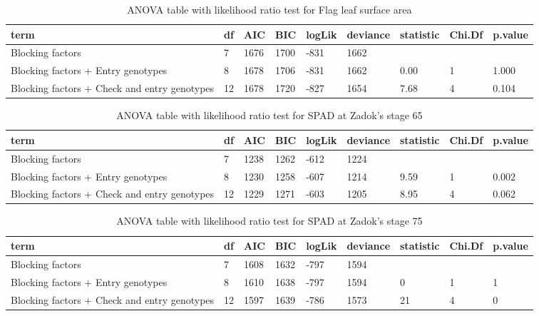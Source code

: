 \documentclass[12pt,oneside]{dukestatscithesis} %
\begin{document}
\begin{table}[H]

\caption{\label{tab:unnamed-chunk-5}\label{tab:lrt-lar}ANOVA table with likelihood ratio test for Flag leaf surface area}
\centering
\begin{tabular}[t]{>{\raggedright\arraybackslash}p{3.5cm}llllllll}
\toprule
term & df & AIC & BIC & logLik & deviance & statistic & Chi.Df & p.value\\
\midrule
Blocking factors & 7 & 1676 & 1700 & -831 & 1662 &  &  & \\
Blocking factors + Entry genotypes & 8 & 1678 & 1706 & -831 & 1662 & 0.00 & 1 & 1.000\\
Blocking factors + Check and entry genotypes & 12 & 1678 & 1720 & -827 & 1654 & 7.68 & 4 & 0.104\\
\bottomrule
\end{tabular}
\end{table}
\begin{table}[H]

\caption{\label{tab:unnamed-chunk-5}\label{tab:lrt-spadi}ANOVA table with likelihood ratio test for SPAD at Zadok's stage 65}
\centering
\begin{tabular}[t]{>{\raggedright\arraybackslash}p{3.5cm}llllllll}
\toprule
term & df & AIC & BIC & logLik & deviance & statistic & Chi.Df & p.value\\
\midrule
Blocking factors & 7 & 1238 & 1262 & -612 & 1224 &  &  & \\
Blocking factors + Entry genotypes & 8 & 1230 & 1258 & -607 & 1214 & 9.59 & 1 & 0.002\\
Blocking factors + Check and entry genotypes & 12 & 1229 & 1271 & -603 & 1205 & 8.95 & 4 & 0.062\\
\bottomrule
\end{tabular}
\end{table}
\begin{table}[H]

\caption{\label{tab:unnamed-chunk-5}\label{tab:lrt-spadii}ANOVA table with likelihood ratio test for SPAD at Zadok's stage 75}
\centering
\begin{tabular}[t]{>{\raggedright\arraybackslash}p{3.5cm}llllllll}
\toprule
term & df & AIC & BIC & logLik & deviance & statistic & Chi.Df & p.value\\
\midrule
Blocking factors & 7 & 1608 & 1632 & -797 & 1594 &  &  & \\
Blocking factors + Entry genotypes & 8 & 1610 & 1638 & -797 & 1594 & 0 & 1 & 1\\
Blocking factors + Check and entry genotypes & 12 & 1597 & 1639 & -786 & 1573 & 21 & 4 & 0\\
\bottomrule
\end{tabular}
\end{table}
\end{document}
